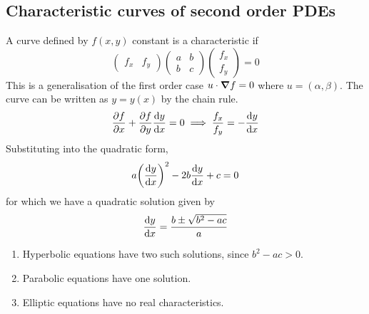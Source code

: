 \subsection{Characteristic curves of second order PDEs}
A curve defined by \( f(x,y) \) constant is a characteristic if
\[
	\begin{pmatrix}
		f_x & f_y
	\end{pmatrix} \begin{pmatrix}
		a & b \\
		b & c
	\end{pmatrix} \begin{pmatrix}
		f_x \\ f_y
	\end{pmatrix} = 0
\]
This is a generalisation of the first order case \( u \cdot \grad{f} = 0 \) where \( u = (\alpha, \beta) \).
The curve can be written as \( y = y(x) \) by the chain rule.
\[
	\pdv{f}{x} + \pdv{f}{y} \dv{y}{x} = 0 \implies \frac{f_x}{f_y} = -\dv{y}{x}
\]
Substituting into the quadratic form,
\[
	a \qty(\dv{y}{x})^2 - 2b \dv{y}{x} + c = 0
\]
for which we have a quadratic solution given by
\[
	\dv{y}{x} = \frac{b \pm \sqrt{b^2 - ac}}{a}
\]
\begin{enumerate}
	\item Hyperbolic equations have two such solutions, since \( b^2 - ac > 0 \).
	\item Parabolic equations have one solution.
	\item Elliptic equations have no real characteristics.
\end{enumerate}

